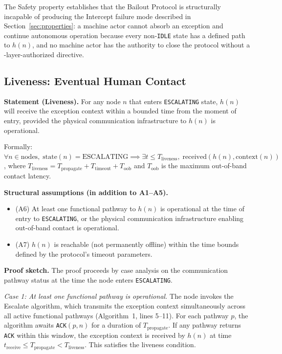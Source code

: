 \medskip
The Safety property establishes that the Bailout Protocol is structurally incapable of producing the Intercept failure mode described in Section~\ref{sec:properties}: a machine actor cannot absorb an exception and continue autonomous operation because every non-\texttt{IDLE} state has a defined path to $h(n)$, and no machine actor has the authority to close the protocol without a \purpose-layer-authorized directive.

\bigskip
\subsection{Liveness: Eventual Human Contact}
\label{sec:liveness}

\textbf{Statement (Liveness).} For any \bxthree{} node $n$ that enters \texttt{ESCALATING} state, $h(n)$ will receive the exception context within a bounded time from the moment of entry, provided the physical communication infrastructure to $h(n)$ is operational.

\bigskip
\noindent
Formally: $\forall n \in \text{nodes},\; \text{state}(n) = \text{ESCALATING} \implies \exists t \leq T_{\text{liveness}},\; \text{received}(h(n), \text{context}(n))$, where $T_{\text{liveness}} = T_{\text{propagate}} + T_{\text{timeout}} + T_{\text{oob}}$ and $T_{\text{oob}}$ is the maximum out-of-band contact latency.

\bigskip
\noindent
\textbf{Structural assumptions (in addition to A1–A5).}
\begin{itemize}\itemsep=0pt
\item[\namedlabel{asm:pathway}]{(A6)} At least one functional pathway to $h(n)$ is operational at the time of entry to \texttt{ESCALATING}, or the physical communication infrastructure enabling out-of-band contact is operational.
\item[\namedlabel{asm:human-available}]{(A7)} $h(n)$ is reachable (not permanently offline) within the time bounds defined by the protocol's timeout parameters.
\end{itemize}

\bigskip
\noindent
\textbf{Proof sketch.} The proof proceeds by case analysis on the communication pathway status at the time the node enters \texttt{ESCALATING}.

\medskip
\noindent
\textit{Case 1: At least one functional pathway is operational.} The node invokes the Escalate algorithm, which transmits the exception context simultaneously across all active functional pathways (Algorithm~1, lines 5–11). For each pathway $p$, the algorithm awaits \texttt{ACK}$(p, n)$ for a duration of $T_{\text{propagate}}$. If any pathway returns \texttt{ACK} within this window, the exception context is received by $h(n)$ at time $t_{\text{receive}} \leq T_{\text{propagate}} < T_{\text{liveness}}$. This satisfies the liveness condition.


